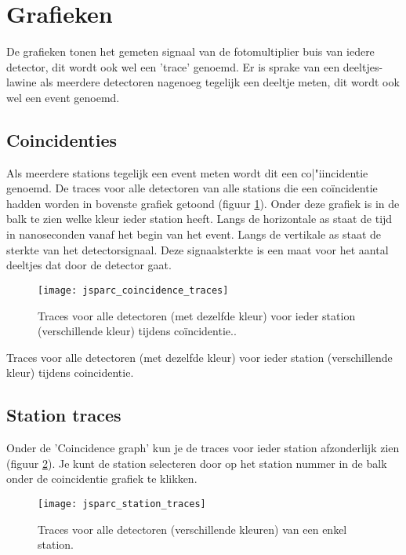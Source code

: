 \section{Grafieken}

De grafieken tonen het gemeten signaal van de fotomultiplier buis van iedere detector, dit wordt ook wel een 'trace' genoemd. Er is sprake van een deeltjes-lawine als meerdere detectoren nagenoeg tegelijk een deeltje meten, dit wordt ook wel een event genoemd.

\subsection{Coincidenties}

Als meerdere stations tegelijk een event meten wordt dit een co|"{i}incidentie genoemd.
De traces voor alle detectoren van alle stations die een co\"incidentie hadden
worden in bovenste grafiek getoond (figuur \ref{fig:stationtrace}). Onder deze grafiek is in de balk te zien 
welke kleur ieder station heeft.  Langs de horizontale as staat de tijd in 
nanoseconden vanaf het begin van het event. Langs de vertikale as staat de 
sterkte van het detectorsignaal. Deze signaalsterkte is een maat voor het aantal deeltjes dat 
door de detector gaat.

\begin{figure}[H]
    \centering
    \texttt{[image: jsparc\_coincidence\_traces]}
    \caption{Traces voor alle detectoren (met dezelfde kleur) voor ieder station 
                 (verschillende kleur) tijdens co\"incidentie..}
    \label{fig:stationtrace}
\end{figure}

   Traces voor alle detectoren (met dezelfde kleur) voor ieder station 
   (verschillende kleur) tijdens coincidentie.
   
\subsection{Station traces}

Onder de 'Coincidence graph' kun je de traces voor ieder station afzonderlijk 
zien (figuur \ref{fig:detectortrace}). Je kunt de station selecteren door op het station nummer in de balk 
onder de coincidentie grafiek te klikken.

\begin{figure}[H]
    \centering
    \texttt{[image: jsparc\_station\_traces]}
    \caption{Traces voor alle detectoren (verschillende kleuren) van een enkel station.}
    \label{fig:detectortrace}
\end{figure}

